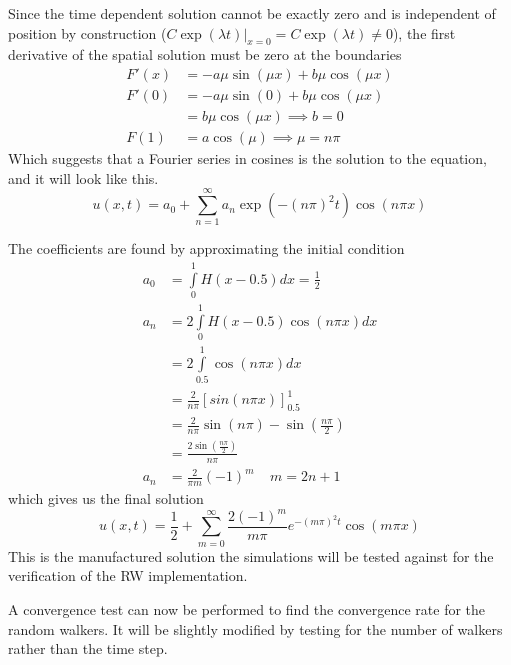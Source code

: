 Since the time dependent solution cannot be exactly zero and is independent of position by construction ($C\exp(\lambda t)|_{x=0} = C\exp(\lambda t) \neq 0$), the first derivative of the spatial solution must be zero at the boundaries
\begin{align*}
 F'(x) &= -a\mu\sin(\mu x) + b\mu\cos(\mu x) \\
 F'(0) &= -a \mu\sin(0) + b\mu\cos(\mu x) \\
 &= b\mu\cos(\mu x) \implies b=0 \\
 F(1) &= a\cos(\mu) \implies \mu = n\pi
\end{align*}
Which suggests that a Fourier series in cosines is the solution to the equation, and it will look like this.
\begin{equation}
 u(x,t) = a_0 + \sum\limits_{n=1}^\infty a_n\exp\left(-(n\pi)^2t\right)\cos(n\pi x)
\end{equation}

The coefficients are found by approximating the initial condition
\begin{align*}
 a_0 &= \int\limits_0^1H(x-0.5)dx = \frac{1}{2} \\
 a_n &= 2\int\limits_0^1H(x-0.5)\cos(n\pi x)dx \\
 &= 2\int\limits_{0.5}^1\cos(n\pi x)dx \\
 &= \frac{2}{n\pi}\left[sin(n\pi x)\right]_{0.5}^1 \\
 &= \frac{2}{n\pi}\sin(n\pi) - \sin(\frac{n\pi}{2}) \\
 &= \frac{2\sin(\frac{n\pi}{2})}{n\pi}\\
 a_n &= \frac{2}{\pi m} (-1)^m\;\;\;\; m=2n+1
\end{align*}
which gives us the final solution
\begin{equation}
 u(x,t) = \frac{1}{2} + \sum\limits_{m=0}^\infty \frac{2(-1)^m}{m\pi}e^{-(m\pi)^2t}\cos(m\pi x)
\end{equation}
This is the manufactured solution the simulations will be tested against for the verification of the RW implementation.


A convergence test can now be performed to find the convergence rate for the random walkers.
It will be slightly modified by testing for the number of walkers rather than the time step. 


